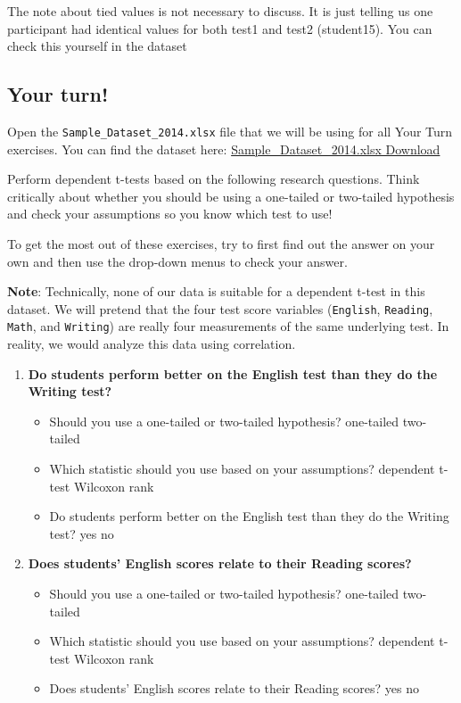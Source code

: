 \documentclass[
]{book}
\begin{document}
The note about tied values is not necessary to discuss. It is just telling us one participant had identical values for both test1 and test2 (student15). You can check this yourself in the dataset

\hypertarget{your-turn-2}{%
\subsection{Your turn!}\label{your-turn-2}}

Open the \texttt{Sample\_Dataset\_2014.xlsx} file that we will be using for all Your Turn exercises. You can find the dataset here: \href{https://github.com/danawanzer/stats-with-jamovi/blob/master/data/Sample_Dataset_2014.xlsx}{Sample\_Dataset\_2014.xlsx Download}

Perform dependent t-tests based on the following research questions. Think critically about whether you should be using a one-tailed or two-tailed hypothesis and check your assumptions so you know which test to use!

To get the most out of these exercises, try to first find out the answer on your own and then use the drop-down menus to check your answer.

\textbf{Note}: Technically, none of our data is suitable for a dependent t-test in this dataset. We will pretend that the four test score variables (\texttt{English}, \texttt{Reading}, \texttt{Math}, and \texttt{Writing}) are really four measurements of the same underlying test. In reality, we would analyze this data using correlation.

\begin{enumerate}
\def\labelenumi{\arabic{enumi}.}
\item
  \textbf{Do students perform better on the English test than they do the Writing test?}

  \begin{itemize}
  \item
    Should you use a one-tailed or two-tailed hypothesis? one-tailed two-tailed
  \item
    Which statistic should you use based on your assumptions? dependent t-test Wilcoxon rank
  \item
    Do students perform better on the English test than they do the Writing test? yes no
  \end{itemize}
\item
  \textbf{Does students' English scores relate to their Reading scores?}

  \begin{itemize}
  \item
    Should you use a one-tailed or two-tailed hypothesis? one-tailed two-tailed
  \item
    Which statistic should you use based on your assumptions? dependent t-test Wilcoxon rank
  \item
    Does students' English scores relate to their Reading scores? yes no
  \end{itemize}
\end{enumerate}
\end{document}
